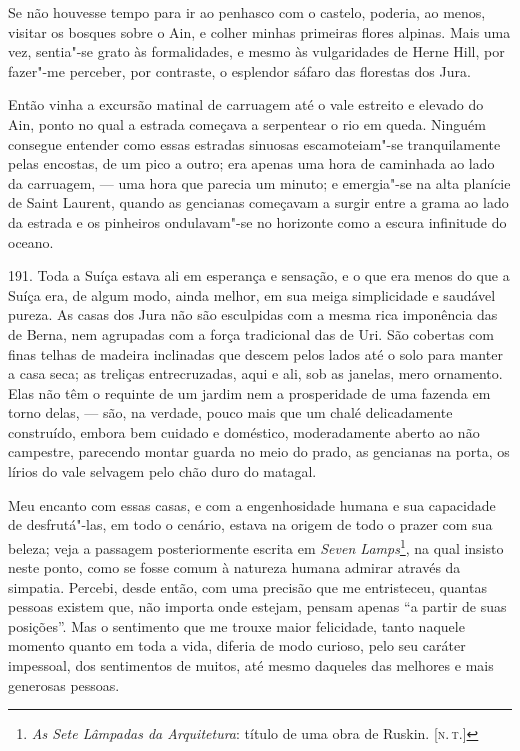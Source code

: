 Se não houvesse tempo para ir ao penhasco com o castelo, poderia, ao
menos, visitar os bosques sobre o Ain, e colher minhas primeiras flores
alpinas. Mais uma vez, sentia"-se grato às formalidades, e mesmo às
vulgaridades de Herne Hill, por fazer"-me perceber, por contraste, o
esplendor sáfaro das florestas dos Jura.

Então vinha a excursão matinal de carruagem até o vale estreito e
elevado do Ain, ponto no qual a estrada começava a serpentear o rio em
queda. Ninguém consegue entender como essas estradas sinuosas
escamoteiam"-se tranquilamente pelas encostas, de um pico a outro; era
apenas uma hora de caminhada ao lado da carruagem, --- uma hora que
parecia um minuto; e emergia"-se na alta planície de Saint Laurent,
quando as gencianas começavam a surgir entre a grama ao lado da estrada
e os pinheiros ondulavam"-se no horizonte como a escura infinitude do
oceano.

191. Toda a Suíça estava ali em esperança e sensação, e o que era menos
do que a Suíça era, de algum modo, ainda melhor, em sua meiga
simplicidade e saudável pureza. As casas dos Jura não são esculpidas com
a mesma rica imponência das de Berna, nem agrupadas com a força
tradicional das de Uri. São cobertas com finas telhas de madeira
inclinadas que descem pelos lados até o solo para manter a casa seca; as
treliças entrecruzadas, aqui e ali, sob as janelas, mero ornamento. Elas
não têm o requinte de um jardim nem a prosperidade de uma fazenda em
torno delas, --- são, na verdade, pouco mais que um chalé delicadamente
construído, embora bem cuidado e doméstico, moderadamente aberto ao não
campestre, parecendo montar guarda no meio do prado, as gencianas na
porta, os lírios do vale selvagem pelo chão duro do matagal.

Meu encanto com essas casas, e com a engenhosidade humana e sua
capacidade de desfrutá"-las, em todo o cenário, estava na origem de todo
o prazer com sua beleza; veja a passagem posteriormente escrita em
\emph{Seven Lamps}\footnote{\emph{As Sete Lâmpadas da Arquitetura}:
  título de uma obra de Ruskin. {[}\textsc{n.\,t.}{]}}, na qual insisto neste
ponto, como se fosse comum à natureza humana admirar através da
simpatia. Percebi, desde então, com uma precisão que me entristeceu,
quantas pessoas existem que, não importa onde estejam, pensam apenas ``a
partir de suas posições''. Mas o sentimento que me trouxe maior
felicidade, tanto naquele momento quanto em toda a vida, diferia de modo
curioso, pelo seu caráter impessoal, dos sentimentos de muitos, até
mesmo daqueles das melhores e mais generosas pessoas.


